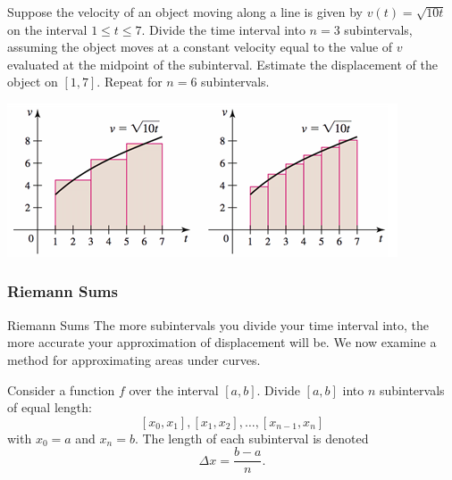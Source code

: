 \documentclass[cal1spr16Lectures.tex]{subfiles}
\begin{document}
\begin{frame}\footnotesize
\begin{ex} 
Suppose the velocity of an object moving along a line is given by $v(t)=\sqrt{10t}$ on the interval $1 \le t \le 7$.  Divide the time interval into $n=3$ subintervals, assuming the object moves at a constant velocity equal to the value of $v$ evaluated at the midpoint of the subinterval.  Estimate the displacement of the object on $[1,7]$.  Repeat for $n=6$ subintervals. 
\vspace{-0.5pc}
\begin{center}
\includegraphics[scale=0.75]{pictures/Ch5Sect1_Exer10}
\end{center}
\end{ex}
\end{frame}

\subsubsection{Riemann Sums}

\begin{frame}{\small Riemann Sums}\footnotesize
The more subintervals you divide your time interval into, the more accurate your approximation of displacement will be.%
We now examine a method for approximating areas under curves.

\vspace{1pc}
Consider a function $f$ over the interval $[a,b]$.  Divide $[a,b]$ into $n$ subintervals of equal length:
\[[x_0,x_1], [x_1,x_2], \dots, [x_{n-1},x_n]\]
with $x_0=a$ and $x_n=b$.  The length of each subinterval is denoted
\[\Delta x = \frac{b-a}{n}.\]
\end{frame}
\end{document}
